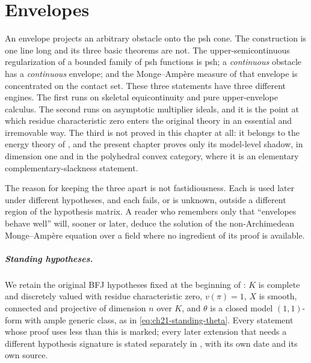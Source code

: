 \chapter{Envelopes}
\label{chap:bfj-envelopes}

An envelope projects an arbitrary obstacle onto the psh cone.  The
construction is one line long and its three basic theorems are not.  The
upper-semicontinuous regularization of a bounded family of psh functions is
psh; a \emph{continuous} obstacle has a \emph{continuous} envelope; and the
Monge--Amp\`ere measure of that envelope is concentrated on the contact set.
These three statements have three different engines.  The first runs on
skeletal equicontinuity and pure upper-envelope calculus.  The second runs on
asymptotic multiplier ideals, and it is the point at which residue
characteristic zero enters the original theory in an essential and
irremovable way.  The third is not proved in this chapter at all: it belongs
to the energy theory of , and the present
chapter proves only its model-level shadow, in dimension one and in the
polyhedral convex category, where it is an elementary complementary-slackness
statement.

The reason for keeping the three apart is not fastidiousness.  Each is used
later under different hypotheses, and each fails, or is unknown, outside a
different region of the hypothesis matrix.  A reader who remembers only that
``envelopes behave well'' will, sooner or later, deduce the solution of the
non-Archimedean Monge--Amp\`ere equation over a field where no ingredient of
its proof is available.

\paragraph{Standing hypotheses.}
We retain the original BFJ hypotheses fixed at the beginning of
: \(K\) is complete and discretely valued with
residue characteristic zero, \(v(\pi)=1\), \(X\) is smooth, connected and
projective of dimension \(n\) over \(K\), and \(\theta\) is a closed model
\((1,1)\)-form with ample generic class, as in
\eqref{eq:ch21-standing-theta}.  Every statement whose proof uses less than
this is marked; every later extension that needs a different hypothesis
signature is stated separately in , with its own date
and its own source.

